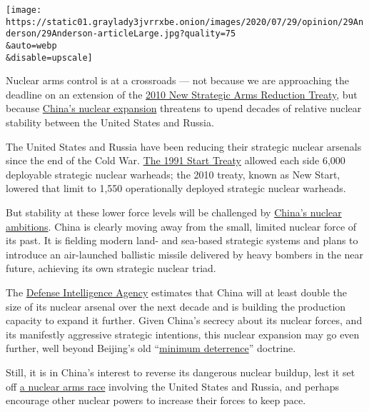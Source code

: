 \texttt{[image: https://static01.graylady3jvrrxbe.onion/images/2020/07/29/opinion/29Anderson/29Anderson-articleLarge.jpg?quality=75\\\&auto=webp\\\&disable=upscale]}

Nuclear arms control is at a crossroads --- not because we are
approaching the deadline on an extension of the
\href{https://www.nytimes3xbfgragh.onion/topic/subject/new-start-treaty}{2010
New Strategic Arms Reduction Treaty}, but because
\href{https://www.nytimes3xbfgragh.onion/2020/06/30/us/politics/trump-russia-china-nuclear.html}{China's
nuclear expansion} threatens to upend decades of relative nuclear
stability between the United States and Russia.

The United States and Russia have been reducing their strategic nuclear
arsenals since the end of the Cold War.
\href{https://www.nytimes3xbfgragh.onion/1991/05/03/opinion/start-treaty-finish-it-lose-it-richard-burt-was-chief-negotiator-strategic-arms.html}{The
1991 Start Treaty} allowed each side 6,000 deployable strategic nuclear
warheads; the 2010 treaty, known as New Start, lowered that limit to
1,550 operationally deployed strategic nuclear warheads.

But stability at these lower force levels will be challenged by
\href{https://www.nti.org/learn/countries/china/}{China's nuclear
ambitions}. China is clearly moving away from the small, limited nuclear
force of its past. It is fielding modern land- and sea-based strategic
systems and plans to introduce an air-launched ballistic missile
delivered by heavy bombers in the near future, achieving its own
strategic nuclear triad.

The
\href{https://www.dia.mil/News/Speeches-and-Testimonies/Article-View/Article/1859890/russian-and-chinese-nuclear-modernization-trends/}{Defense
Intelligence Agency} estimates that China will at least double the size
of its nuclear arsenal over the next decade and is building the
production capacity to expand it further. Given China's secrecy about
its nuclear forces, and its manifestly aggressive strategic intentions,
this nuclear expansion may go even further, well beyond Beijing's old
``\href{https://carnegieendowment.org/2016/06/30/china-s-nuclear-doctrine-debates-and-evolution-pub-63967}{minimum
deterrence}'' doctrine.

Still, it is in China's interest to reverse its dangerous nuclear
buildup, lest it set off
\href{https://www.nytimes3xbfgragh.onion/2019/08/08/world/europe/arms-race-russia-china.html}{a
nuclear arms race} involving the United States and Russia, and perhaps
encourage other nuclear powers to increase their forces to keep pace.

